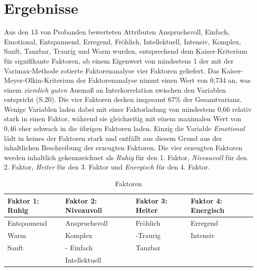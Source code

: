 \section*{Ergebnisse}
\label{sec:Ergebnisse}
Aus den 13 von Probanden bewerteten Attributen Anspruchsvoll, Einfach, Emotional, Entspannend, Erregend, Fröhlich, Intellektuell, Intensiv, Komplex, Sanft, Tanzbar, Traurig und Warm wurden, entsprechend dem Kaiser-Kriterium für signifikante Faktoren, ab einem Eigenwert von mindestens 1 der mit der Varimax-Methode rotierte Faktorenanalyse vier Faktoren geliefert.
Das Kaiser-Meyer-Olkin-Kriterium der Faktorenanalyse nimmt einen Wert von 0,734 an, was einem \textit{ziemlich guten} Ausmaß an Interkorrelation zwischen den Variablen entspricht \cite{eckey2002multivariate} (S.20).
Die vier Faktoren decken insgesamt 67\% der Gesamtvarianz.
Wenige Variablen laden dabei mit einer Faktorladung von mindestens 0,66 relativ stark in einen Faktor, während sie gleichzeitig mit einem maximalen Wert von 0,46 eher schwach in die übrigen Faktoren laden.
Einzig die Variable \textit{Emotional} lädt in keines der Faktoren stark und entfällt aus diesem Grund aus der inhaltlichen Beschreibung der erzeugten Faktoren.
Die vier erzeugten Faktoren werden inhaltlich gekennzeichnet als \textit{Ruhig} für den 1. Faktor, \textit{Niveauvoll} für den 2. Faktor, \textit{Heiter} für den 3. Faktor und \textit{Energisch} für den 4. Faktor.   


\begin{table}[htbp]
    \centering
    \caption{Faktoren}
    \vspace{2mm}
    \label{tab:faktoren}
        \begin{tabularx}{8cm}{|X|X|X|X|}
            \hline Faktor 1: Ruhig & Faktor 2: Niveauvoll & Faktor 3: Heiter & Faktor 4: Energisch \\
            \hline Entspan\-nend & Anspruchs\-voll       & Fröhlich             & Erregend \\
            \hline Warm              & Komplex                  & -Traurig             & Intensiv \\
            \hline Sanft               & - Einfach                 & Tanzbar             & \\
            \hline                        & Intellek\-tuell          &                          & \\
            \hline
        \end{tabularx}
\end{table}

